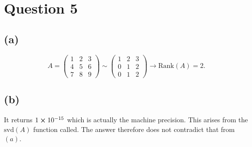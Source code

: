 \documentclass[12pt]{article}
\begin{document}
	\section*{Question 5}
		\subsection*{(a)}
			$$ A = \begin{pmatrix}
				1 & 2 & 3 \\ 4 & 5 & 6 \\ 7 & 8 & 9
			\end{pmatrix} \sim \begin{pmatrix}
				1 & 2 & 3 \\
				0 & 1 & 2 \\
				0 & 1 & 2
			\end{pmatrix} \xrightarrow{} \text{Rank}(A) = 2.$$
		\subsection*{(b)}	
			It returns $1 \cross 10^{-15}$ which is actually the machine precision. This arises from the $\text{svd}(A)$ function called. The answer therefore does not contradict that from $(a)$. 
\end{document}
